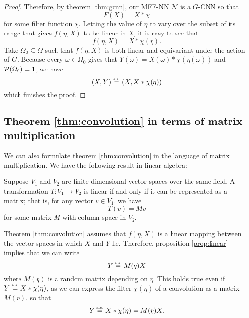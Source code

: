 \documentclass[10pt]{article}
\begin{document}
\begin{proof}
Therefore, by theorem \ref{thm:gcnn}, our MFF-NN $\mathcal{N}$ is a $G$-CNN so that
$$
	F(X) = X * \chi
$$
for some filter function $\chi$.
Letting the value of $\eta$ to vary over the subset of its range that gives $f(\eta,X)$ to be linear in $X$, it is easy to see that
$$
	f(\eta,X) = X * \chi(\eta).
$$
Take $\Omega_0 \subseteq \Omega$ such that $f(\eta,X)$ is both linear and equivariant under the action of $G$.
Because every $\omega \in \Omega_0$ gives that $Y(\omega) = X(\omega) * \chi(\eta(\omega))$ and $\P(\Omega_0) = 1$, we have
$$
	(X,Y) \equas (X,X * \chi(\eta))
$$
which finishes the proof.
\end{proof}

\subsection{Theorem \ref{thm:convolution} in terms of matrix multiplication}
We can also formulate theorem \ref{thm:convolution} in the language of matrix multiplication.
We have the following result in linear algebra:
\begin{proposition} \label{prop:linear}
Suppose $V_1$ and $V_2$ are finite dimensional vector spaces over the same field.
A transformation $T: V_1 \to V_2$ is linear if and only if it can be represented as a matrix; that is, for any vector $v \in V_1$, we have
$$
	T(v) = Mv
$$
for some matrix $M$ with column space in $V_2$.
\end{proposition}
Theorem \ref{thm:convolution} assumes that $f(\eta, X)$ is a linear mapping between the vector spaces in which $X$ and $Y$ lie.
Therefore, proposition \ref{prop:linear} implies that we can write
$$
	Y \equas M(\eta) X
$$
where $M(\eta)$ is a random matrix depending on $\eta$.
This holds true even if $Y \equas X * \chi(\eta)$, as we can express the filter $\chi(\eta)$ of a convolution as a matrix $M(\eta)$, so that
$$
	Y \equas X * \chi(\eta) = M(\eta)X.
$$


\clearpage
\appendix





\printbibliography
\end{document}
